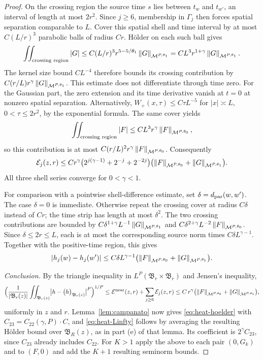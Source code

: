 \documentclass[11pt,reqno]{amsart}
\begin{document}
\begin{proof}
On the crossing region the source time $s$ lies between $t_w$ and $t_{w'}$,
an interval of length at most $2r^2$. Since $j\ge6$, membership in
$\Gamma_j$ then forces spatial separation comparable to $L$.
Cover this spatial shell and time interval by at most $C(L/r)^3$
parabolic balls of radius $Cr$. H\"older on each such ball gives
\[
 \iint_{\text{crossing region}}|G|
 \le C(L/r)^3 r^{5-5/\theta_1}
             \left\lVert G \right\rVert_{\mathcal M^{P,\theta_1}}
 = C L^3r^{1+\gamma}\left\lVert G \right\rVert_{\mathcal M^{P,\theta_1}}.
\]
The kernel size bound $CL^{-4}$ therefore bounds its crossing contribution
by $C(r/L)r^\gamma\left\lVert G \right\rVert_{\mathcal M^{P,\theta_1}}$.
This estimate does not differentiate through time zero.
For the Gaussian part, the zero extension and its time derivative vanish
at $t=0$ at nonzero spatial separation. Alternatively,
$W_+(x,\tau)\le C\tau L^{-5}$ for $|x|\asymp L$, $0<\tau\le2r^2$,
by the exponential formula. The same cover yields
\[
 \iint_{\text{crossing region}}|F|
       \le C L^3r^\gamma\left\lVert F \right\rVert_{\mathcal M^{P,\theta_0}},
\]
so this contribution is at most
$C(r/L)^2r^\gamma\left\lVert F \right\rVert_{\mathcal M^{P,\theta_0}}$.
Consequently
\[
 \mathcal E_j(z,r)\le C r^\gamma
       \bigl(2^{j(\gamma-1)}+2^{-j}+2^{-2j}\bigr)
       \bigl(\left\lVert F \right\rVert_{\mathcal M^{P,\theta_0}}
                      +\left\lVert G \right\rVert_{\mathcal M^{P,\theta_1}}\bigr).
\]
All three shell series converge for $0<\gamma<1$.

For comparison with a pointwise shell-difference estimate, set
$\delta=d_{\mathrm{par}}(w,w')$. The case $\delta=0$ is immediate. Otherwise repeat
the crossing cover at radius $C\delta$ instead of $Cr$; the time strip
has length at most $\delta^2$. The two crossing contributions are bounded by
$C\delta^{1+\gamma}L^{-1}\left\lVert G \right\rVert_{\mathcal M^{P,\theta_1}}$ and
$C\delta^{2+\gamma}L^{-2}\left\lVert F \right\rVert_{\mathcal M^{P,\theta_0}}$.
Since $\delta\le2r\le L$, each is at most the corresponding source norm
times $C\delta L^{\gamma-1}$. Together with the positive-time region,
this gives
\[
 |h_j(w)-h_j(w')|\le C\delta L^{\gamma-1}
    \bigl(\left\lVert F \right\rVert_{\mathcal M^{P,\theta_0}}
                   +\left\lVert G \right\rVert_{\mathcal M^{P,\theta_1}}\bigr).
\]
%
%
%
%
%

\emph{Conclusion.} By the triangle inequality in
$L^{P}(\mathfrak{B}_{r}\times\mathfrak{B}_{r})$ and Jensen's inequality,
\[
  \Bigl(\frac{1}{\left\lvert \mathfrak{B}_{r}(z) \right\rvert}\iint_{\mathfrak{B}_{r}(z)}
     \bigl|h-\bigl(h\bigr)_{\mathfrak{B}_{r}(z)}\bigr|^{P}\Bigr)^{1/P}
  \le\mathcal{E}^{\mathrm{near}}(z,r)+\sum_{j\ge6}\mathcal{E}_{j}(z,r)
  \le C\,r^{\gamma}\bigl(\left\lVert F \right\rVert_{\mathcal{M}^{P,\theta_{0}}}
       +\left\lVert G \right\rVert_{\mathcal{M}^{P,\theta_{1}}}\bigr),
\]
uniformly in $z$ and $r$. Lemma~\ref{lem:campanato} now gives
\eqref{eq:heat-hoelder} with $C_{23}=C_{22}(\gamma,P)\cdot C$, and
\eqref{eq:heat-Linfty} follows by averaging the resulting H\"older
bound over $\mathfrak B_R(z)$, as in part (e) of that lemma. Its coefficient
is $2^\gamma C_{23}$, since $C_{23}$ already includes $C_{22}$.
For $K>1$ apply the
above to each pair $(0,G_{k})$ and to $(F,0)$ and add the $K+1$ resulting
seminorm bounds.
\end{proof}
\end{document}

